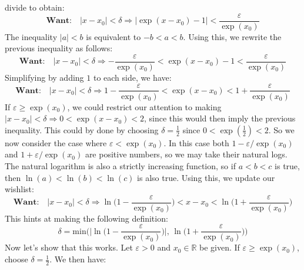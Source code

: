 \documentclass{article}
\theoremstyle{normal}
\begin{document}
    divide to obtain:
    \begin{equation}
        \textbf{Want:}\quad
        |x-x_{0}|<\delta
        \Rightarrow
        \big|\exp(x-x_{0})-1\big|<\frac{\varepsilon}{\exp(x_{0})}
    \end{equation}
    The inequality $|a|<b$ is equivalent to $-b<a<b$. Using this, we rewrite
    the previous inequality as follows:
    \begin{equation}
        \textbf{Want:}\quad
        |x-x_{0}|<\delta
        \Rightarrow
        -\frac{\varepsilon}{\exp(x_{0})}
            <\exp(x-x_{0})-1
            <\frac{\varepsilon}{\exp(x_{0})}
    \end{equation}
    Simplifying by adding $1$ to each side, we have:
    \begin{equation}
        \textbf{Want:}\quad
        |x-x_{0}|<\delta
        \Rightarrow
        1-\frac{\varepsilon}{\exp(x_{0})}
            <\exp(x-x_{0})
            <1+\frac{\varepsilon}{\exp(x_{0})}
    \end{equation}
    If $\varepsilon\geq\exp(x_{0})$, we could restrict our attention to making
    $|x-x_{0}|<\delta\Rightarrow{0}<\exp(x-x_{0})<2$, since this would then
    imply the previous inequality. This could by done by choosing
    $\delta=\frac{1}{2}$ since $0<\exp(\frac{1}{2})<2$. So we now consider the
    case where $\varepsilon<\exp(x_{0})$. In this case both
    $1-\varepsilon/\exp(x_{0})$ and $1+\varepsilon/\exp(x_{0})$ are positive
    numbers, so we may take their natural logs. The natural logarithm is
    also a strictly increasing function, so if $a<b<c$ is true, then
    $\ln(a)<\ln(b)<\ln(c)$ is also true. Using this, we update our wishlist:
    \begin{equation}
        \textbf{Want:}\quad
        |x-x_{0}|<\delta
        \Rightarrow
        \ln\big(1-\frac{\varepsilon}{\exp(x_{0})}\big)
            <x-x_{0}
            <\ln\big(1+\frac{\varepsilon}{\exp(x_{0})}\big)
    \end{equation}
    This hints at making the following definition:
    \begin{equation}
        \delta=\textrm{min}\Big(
            \big|\ln\big(1-\frac{\varepsilon}{\exp(x_{0})}\big)\big|,\,
            \ln\big(1+\frac{\varepsilon}{\exp(x_{0})}\big)
        \Big)
    \end{equation}
    Now let's show that this works. Let $\varepsilon>0$ and $x_{0}\in\mathbb{R}$
    be given. If $\varepsilon\geq\exp(x_{0})$, choose $\delta=\frac{1}{2}$.
    We then have:
\end{document}
